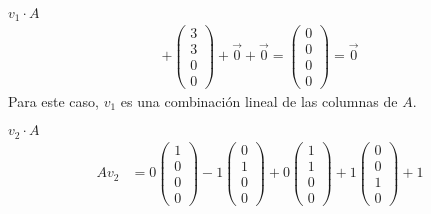 \documentclass{article}
\begin{document}
\begin{enumerate}
\begin{mathcase}{\(v_1 \cdot A\)}
\[\begin{aligned}
                    +
                    \begin{pmatrix}
                        3 \\ 3 \\ 0 \\ 0
                    \end{pmatrix}
                    +
                    \vec{0}
                    +
                    \vec{0} 
                    =
                    \begin{pmatrix}
                        0 \\ 0 \\ 0 \\ 0
                    \end{pmatrix}
                    =
                    \vec{0}
                \end{aligned}
            \]
            Para este caso, \(v_1\) es una combinación lineal de las columnas de \(A\).
        \end{mathcase}
        \begin{mathcase}{\(v_2 \cdot A\)}
            \[
                \begin{aligned}
                    Av_2 &= 
                    0
                    \begin{pmatrix}
                        1 \\ 0 \\ 0 \\ 0
                    \end{pmatrix}
                    -1
                    \begin{pmatrix}
                        0 \\ 1 \\ 0 \\ 0
                    \end{pmatrix}
                    +0
                    \begin{pmatrix}
                        1 \\ 1 \\ 0 \\ 0
                    \end{pmatrix}
                    +1
                    \begin{pmatrix}
                        0 \\ 0 \\ 1 \\ 0
                    \end{pmatrix}
                    +1

\end{aligned}\]
\end{mathcase}
\end{enumerate}
\end{document}

